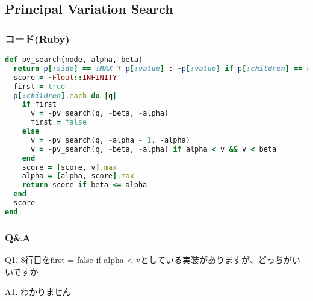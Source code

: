 \documentclass[11pt,a4paper]{ltjsarticle}
\begin{document}
\subsection{Principal Variation Search}


\subsubsection{コード(Ruby)}

\begin{lstlisting}[language=ruby,caption=pv-search.rb]
def pv_search(node, alpha, beta)
  return p[:side] == :MAX ? p[:value] : -p[:value] if p[:children] == nil
  score = -Float::INFINITY
  first = true
  p[:children].each do |q|
    if first
      v = -pv_search(q, -beta, -alpha)
      first = false
    else
      v = -pv_search(q, -alpha - 1, -alpha)
      v = -pv_search(q, -beta, -alpha) if alpha < v && v < beta
    end
    score = [score, v].max
    alpha = [alpha, score].max
    return score if beta <= alpha
  end
  score
end
\end{lstlisting}


\subsubsection{Q\&A}

Q1. 8行目をfirst = false if alpha < vとしている実装がありますが、どっちがいいですか

A1. わかりません











\end{document}
